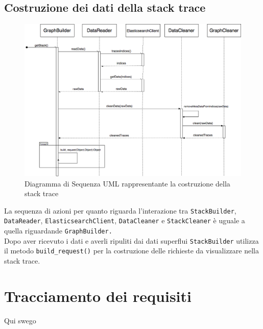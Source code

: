 \subsection{Costruzione dei dati della stack trace}
\begin{figure}[H]
	\centering
	\includegraphics[width=1\textwidth]{Images/DiagrammaSequenzaStack.png}
	\caption{Diagramma di Sequenza UML rappresentante la costruzione della stack trace}
	\label{img:seqGraph}
\end{figure}
La sequenza di azioni per quanto riguarda l'interazione tra \texttt{StackBuilder}, \texttt{DataReader}, \texttt{ElasticsearchClient}, \texttt{DataCleaner} e \texttt{StackCleaner} è uguale a quella riguardande \texttt{GraphBuilder.}\\
Dopo aver ricevuto i dati e averli ripuliti dai dati superflui \texttt{StackBuilder} utilizza il metodo \texttt{build\_request()} per la costruzione delle richieste da visualizzare nella stack trace.


\section{Tracciamento dei requisiti}
\label{sec:Tracciamento}
Qui swego 
